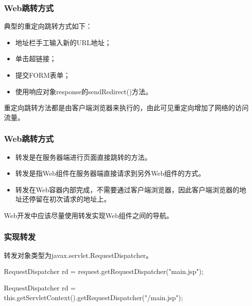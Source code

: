 \begin{frame}[fragile] %
  \frametitle{Web跳转方式} 


  典型的重定向跳转方式如下：

  \begin{itemize}
  \item 地址栏手工输入新的URL地址；
  \item 单击超链接；
  \item 提交FORM表单；
  \item 使用响应对象response的sendRedirect()方法。
  \end{itemize}

  {\Blue\hei 重定向跳转方法都是由客户端浏览器来执行的，由此可见重定向增加了网络的访问流量。}
\end{frame}

\begin{frame}[fragile] %
  \frametitle{Web跳转方式} 


  \begin{itemize}
  \item 转发是在服务器端进行页面直接跳转的方法。
  \item 转发是指Web组件在服务器端直接请求到另外Web组件的方式。
  \item 转发在Web容器内部完成，不需要通过客户端浏览器，因此客户端浏览器的地址还停留在初次请求的地址上。
  \end{itemize}

  {\Blue\hei Web开发中应该尽量使用转发实现Web组件之间的导航。}
\end{frame}

\begin{frame}[fragile] %
  \frametitle{实现转发} 


  转发对象类型为javax.servlet.RequestDispatcher。


  \begin{javaCode}
    RequestDispatcher rd = request.getRequestDispatcher("main.jsp");
  \end{javaCode}


  \begin{javaCode}
    RequestDispatcher rd = this.getServletContext().getRequestDispatcher("/main.jsp");
  \end{javaCode}
\end{frame}

